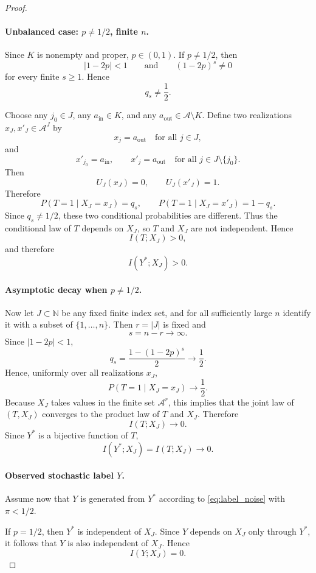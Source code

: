 \documentclass{article}
\theoremstyle{plain}
\theoremstyle{definition}
\theoremstyle{remark}
\begin{document}
\begin{proof}
\paragraph{Unbalanced case: \(p\neq 1/2\), finite \(n\).}
Since \(K\) is nonempty and proper, \(p\in(0,1)\). If \(p\neq 1/2\), then
\[
|1-2p|<1
\qquad\text{and}\qquad
(1-2p)^s \neq 0
\]
for every finite \(s\ge 1\). Hence
\[
q_s \neq \frac12.
\]

Choose any \(j_0\in J\), any \(a_{\mathrm{in}}\in K\), and any
\(a_{\mathrm{out}}\in \mathcal A\setminus K\). Define two realizations
\(x_J,x'_J\in \mathcal A^J\) by
\[
x_j = a_{\mathrm{out}} \quad \text{for all } j\in J,
\]
and
\[
x'_{j_0}=a_{\mathrm{in}},
\qquad
x'_j=a_{\mathrm{out}} \quad \text{for all } j\in J\setminus\{j_0\}.
\]
Then
\[
U_J(x_J)=0,
\qquad
U_J(x'_J)=1.
\]
Therefore
\[
P(T=1\mid X_J=x_J)=q_s,
\qquad
P(T=1\mid X_J=x'_J)=1-q_s.
\]
Since \(q_s\neq 1/2\), these two conditional probabilities are different. Thus the
conditional law of \(T\) depends on \(X_J\), so \(T\) and \(X_J\) are not independent.
Hence
\[
I(T;X_J)>0,
\]
and therefore
\[
I(Y^*;X_J)>0.
\]

\paragraph{Asymptotic decay when \(p\neq 1/2\).}
Now let \(J\subset\mathbb N\) be any fixed finite index set, and for all sufficiently large
\(n\) identify it with a subset of \(\{1,\ldots,n\}\). Then \(r=|J|\) is fixed and
\[
s=n-r \to \infty.
\]
Since \(|1-2p|<1\),
\[
q_s = \frac{1-(1-2p)^s}{2} \to \frac12.
\]
Hence, uniformly over all realizations \(x_J\),
\[
P(T=1\mid X_J=x_J)\to \frac12.
\]
Because \(X_J\) takes values in the finite set \(\mathcal A^r\), this implies that the joint
law of \((T,X_J)\) converges to the product law of \(T\) and \(X_J\). Therefore
\[
I(T;X_J)\to 0.
\]
Since \(Y^*\) is a bijective function of \(T\),
\[
I(Y^*;X_J)=I(T;X_J)\to 0.
\]

\paragraph{Observed stochastic label \(Y\).}
Assume now that \(Y\) is generated from \(Y^*\) according to \eqref{eq:label_noise}
with \(\pi<1/2\).

If \(p=1/2\), then \(Y^*\) is independent of \(X_J\). Since \(Y\) depends on \(X_J\)
only through \(Y^*\), it follows that \(Y\) is also independent of \(X_J\). Hence
\[
I(Y;X_J)=0.
\]


\end{proof}
\end{document}
